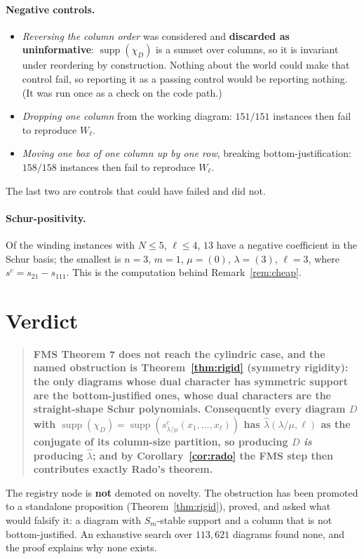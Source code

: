 \documentclass[11pt]{article}
\theoremstyle{definition}
\DeclareMathOperator{\supp}{supp}
\begin{document}
\paragraph{Negative controls.}
\begin{itemize}
\item \emph{Reversing the column order} was considered and \textbf{discarded as uninformative}:
$\supp(\chi_D)$ is a sumset over columns, so it is invariant under reordering by construction.
Nothing about the world could make that control fail, so reporting it as a passing control
would be reporting nothing. (It was run once as a check on the code path.)
\item \emph{Dropping one column} from the working diagram: $151/151$ instances then fail to
reproduce $W_\ell$.
\item \emph{Moving one box of one column up by one row}, breaking bottom-justification:
$158/158$ instances then fail to reproduce $W_\ell$.
\end{itemize}
The last two are controls that could have failed and did not.

\paragraph{Schur-positivity.} Of the winding instances with $N\le5$, $\ell\le4$, $13$ have a
negative coefficient in the Schur basis; the smallest is $n=3$, $m=1$, $\mu=(0)$, $\lambda=(3)$,
$\ell=3$, where $s^c=s_{21}-s_{111}$. This is the computation behind Remark~\ref{rem:cheap}.

\section{Verdict}

\begin{quote}
\textbf{FMS Theorem 7 does not reach the cylindric case, and the named obstruction is
Theorem~\ref{thm:rigid} (symmetry rigidity): the only diagrams whose dual character has
symmetric support are the bottom-justified ones, whose dual characters are the straight-shape
Schur polynomials. Consequently every diagram $D$ with
$\supp(\chi_D)=\supp(s^c_{\lambda/\mu}(x_1,\dots,x_\ell))$ has $\hat\lambda(\lambda/\mu,\ell)$
as the conjugate of its column-size partition, so producing $D$ \emph{is} producing
$\hat\lambda$; and by Corollary~\ref{cor:rado} the FMS step then contributes exactly Rado's
theorem.}
\end{quote}

The registry node is \textbf{not} demoted on novelty. The obstruction has been promoted to a
standalone proposition (Theorem~\ref{thm:rigid}), proved, and asked what would falsify it: a
diagram with $S_m$-stable support and a column that is not bottom-justified. An exhaustive
search over $113{,}621$ diagrams found none, and the proof explains why none exists.
\end{document}
